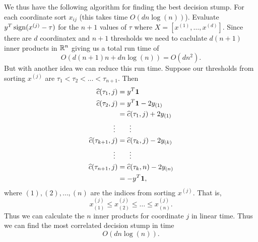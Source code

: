 We thus have the following algorithm for finding the best decision stump. For each coordinate sort $x_{ij}$ (this takes time $O(dn\log(n))$). Evaluate $y^T\operatorname{sign}(x^{(j)}-\tau)$ for the $n+1$ values of $\tau$ where $X= [x^{(1)},\ldots, x^{(d)}]$. Since there are $d$ coordinatex and $n+1$ thresholds we need to caclulate $d(n+1)$ inner products in ${\mathbb R}^n$ giving us a total run time of \[O(d(n+1)n+dn\log(n))=O(dn^2).\] 
But with another idea we can reduce this run time. Suppose our thresholds from sorting $x^{(j)}$ are $\tau_1 < \tau_2 < \ldots < \tau_{n+1}$. Then 
\begin{align*}
    \widehat{c}(\tau_1,j) &= y^T{{\bf 1}} \\
    \widehat{c}(\tau_2,j) &= y^T{{\bf 1}} - 2y_{(1)}\\
    &= \widehat{c}(\tau_1,j) + 2y_{(1)}\\
    \vdots ~&~~~~~ \vdots \\
    \widehat{c}(\tau_{k+1},j) &= \widehat{c}(\tau_k,j)-2y_{(k)}\\
    \vdots ~&~~~~~ \vdots \\
    \widehat{c}(\tau_{n+1},j) &= \widehat{c}(\tau_k,n)-2y_{(n)}\\
    &=-y^T{{\bf 1}},
\end{align*}
where $(1), (2),\ldots, (n)$ are the indices from sorting $x^{(j)}$. That is,
\[x^{(j)}_{(1)} \le x^{(j)}_{(2)} \le \ldots \le x^{(j)}_{(n)}.  \]
Thus we can calculate the $n$ inner products for coordinate $j$ in linear time. Thus we can find the most correlated decision stump in time \[O(dn\log(n)).\]
